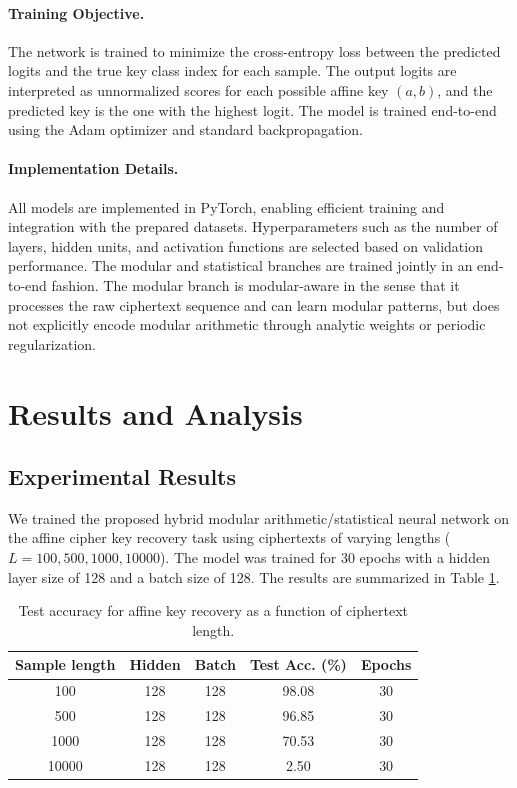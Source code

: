 \documentclass[manuscript,screen,acmtog,natbib=false]{acmart}
\begin{document}
    \paragraph{Training Objective.}
    The network is trained to minimize the cross-entropy loss between the predicted logits and the true key class index for each sample. The output logits are interpreted as unnormalized scores for each possible affine key $(a, b)$, and the predicted key is the one with the highest logit. The model is trained end-to-end using the Adam optimizer and standard backpropagation.

    \paragraph{Implementation Details.}
    All models are implemented in PyTorch, enabling efficient training and integration with the prepared datasets. Hyperparameters such as the number of layers, hidden units, and activation functions are selected based on validation performance. The modular and statistical branches are trained jointly in an end-to-end fashion. The modular branch is modular-aware in the sense that it processes the raw ciphertext sequence and can learn modular patterns, but does not explicitly encode modular arithmetic through analytic weights or periodic regularization.

  \section{Results and Analysis}

  \subsection{Experimental Results}

  We trained the proposed hybrid modular arithmetic/statistical neural network on the affine cipher key recovery 
  task using ciphertexts of varying lengths (\(L = 100, 500, 1000, 10000\)). The model was trained for 30 epochs with a hidden layer size 
  of 128 and a batch size of 128. The results are summarized in Table \ref{tab:main-results}.
  
  \begin{table}[h]
    \centering
    \small
    \caption{Test accuracy for affine key recovery as a function of ciphertext length.}
    \label{tab:main-results}
    \begin{tabular}{ccccc}
        \toprule
        Sample length & Hidden & Batch & Test Acc. (\%) & Epochs \\
        \midrule
        100   & 128 & 128 & 98.08 & 30 \\
        500   & 128 & 128 & 96.85 & 30 \\
        1000  & 128 & 128 & 70.53 & 30 \\
        10000  & 128 & 128 & 2.50 & 30 \\
        \bottomrule
    \end{tabular}
  \end{table}
\end{document}

